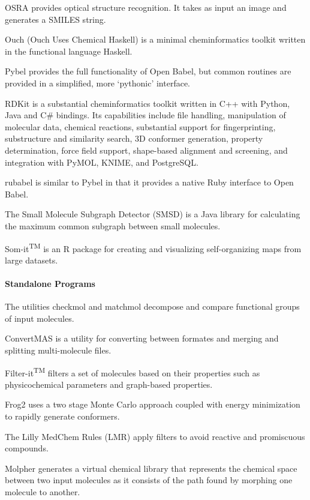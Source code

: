OSRA \cite{Filippov_2009} provides optical structure recognition. It takes as input an image and generates a SMILES string.

Ouch (Ouch Uses Chemical Haskell) is a minimal cheminformatics toolkit written in the functional language Haskell.

Pybel \cite{pybel} provides the full functionality of Open Babel, but common routines are provided in a simplified, more `pythonic' interface.

RDKit is a substantial cheminformatics toolkit written in C++ with Python, Java and C\# bindings.  Its capabilities include file handling, manipulation of molecular data, chemical reactions, substantial support for fingerprinting, substructure and similarity search, 3D conformer generation, property determination, force field support, shape-based alignment and screening, and integration with PyMOL, KNIME, and PostgreSQL.

rubabel \cite{Smith_2013} is similar to Pybel in that it provides a native Ruby interface to Open Babel.

The Small Molecule Subgraph Detector (SMSD) \cite{Rahman_2009} is a Java library for calculating the maximum common subgraph between small molecules.

Som-it\textsuperscript{TM}  is an R package for creating and visualizing self-organizing maps from large datasets.


\paragraph{Standalone Programs}

The utilities checkmol and matchmol \cite{Haider_2010} decompose and compare functional groups of input molecules.

ConvertMAS is a utility for converting between formates and merging and splitting multi-molecule files.

Filter-it\textsuperscript{TM} filters a set of molecules based on their properties such as physicochemical parameters and graph-based properties. 

Frog2 \cite{Miteva_2010} uses a two stage Monte Carlo approach coupled with energy minimization to rapidly generate conformers.

The Lilly MedChem Rules (LMR)  \cite{Bruns_2012} apply filters to avoid reactive and promiscuous compounds.

Molpher  \cite{Hoksza_2014} generates a virtual chemical library that represents the chemical space between two input molecules as it consists of the path found by morphing one molecule to another.

